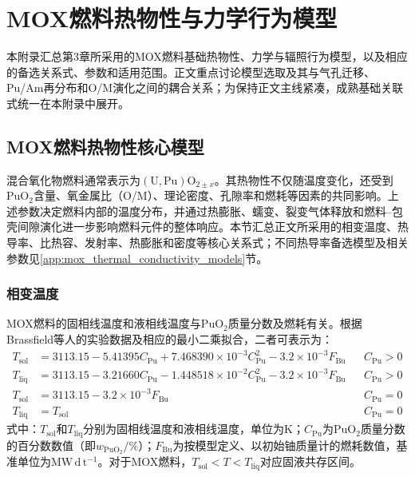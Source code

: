 \chapter{MOX燃料热物性与力学行为模型}
\label{app:mox_supplementary_models}

本附录汇总第3章所采用的MOX燃料基础热物性、力学与辐照行为模型，以及相应的备选关系式、参数和适用范围。正文重点讨论模型选取及其与气孔迁移、Pu/Am再分布和O/M演化之间的耦合关系；为保持正文主线紧凑，成熟基础关联式统一在本附录中展开。

\section{MOX燃料热物性核心模型}
\label{app:mox_core_thermophysical_models}

混合氧化物燃料通常表示为$(\mathrm{U},\mathrm{Pu})\mathrm{O}_{2\pm x}$。其热物性不仅随温度变化，还受到$\mathrm{PuO}_2$含量、氧金属比（O/M）、理论密度、孔隙率和燃耗等因素的共同影响。上述参数决定燃料内部的温度分布，并通过热膨胀、蠕变、裂变气体释放和燃料--包壳间隙演化进一步影响燃料元件的整体响应。本节汇总正文所采用的相变温度、热导率、比热容、发射率、热膨胀和密度等核心关系式；不同热导率备选模型及相关参数见\ref{app:mox_thermal_conductivity_models}节。

\subsection{相变温度}

MOX燃料的固相线温度和液相线温度与$\mathrm{PuO}_2$质量分数及燃耗有关。根据Brassfield等人的实验数据及相应的最小二乘拟合，二者可表示为：
\begin{subequations}\label{eq:mox_phase_transition_temperature}
	\begin{align}
		T_{\mathrm{sol}}
		&=3113.15-5.41395C_{\mathrm{Pu}}
		+7.468390\times10^{-3}C_{\mathrm{Pu}}^{2}
		-3.2\times10^{-3}F_{\mathrm{Bu}}
		&& C_{\mathrm{Pu}}>0\label{eq:mox_solidus_with_pu}\\
		T_{\mathrm{liq}}
		&=3113.15-3.21660C_{\mathrm{Pu}}
		-1.448518\times10^{-2}C_{\mathrm{Pu}}^{2}
		-3.2\times10^{-3}F_{\mathrm{Bu}}
		&& C_{\mathrm{Pu}}>0\label{eq:mox_liquidus_with_pu}\\
		T_{\mathrm{sol}}
		&=3113.15-3.2\times10^{-3}F_{\mathrm{Bu}}
		&& C_{\mathrm{Pu}}=0\label{eq:uo2_solidus}\\
		T_{\mathrm{liq}}&=T_{\mathrm{sol}}
		&& C_{\mathrm{Pu}}=0\label{eq:uo2_liquidus}
	\end{align}
\end{subequations}
\noindent 式中：$T_{\mathrm{sol}}$和$T_{\mathrm{liq}}$分别为固相线温度和液相线温度，单位为$\mathrm{K}$；$C_{\mathrm{Pu}}$为$\mathrm{PuO}_2$质量分数的百分数数值（即$w_{\mathrm{PuO}_2}/\%$）；$F_{\mathrm{Bu}}$为按模型定义、以初始铀质量计的燃耗数值，基准单位为$\mathrm{MW\,d\,t^{-1}}$。对于MOX燃料，$T_{\mathrm{sol}}<T<T_{\mathrm{liq}}$对应固液共存区间。

